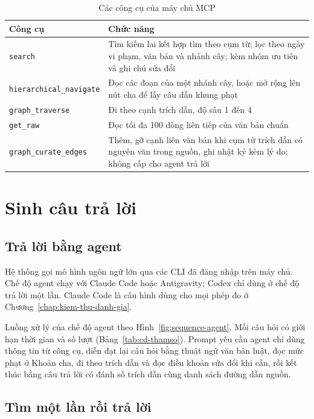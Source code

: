 \begin{table}[H]
\centering
\caption{Các công cụ của máy chủ MCP}
\label{tab:mcp-tools}
\footnotesize
\begin{tabularx}{\textwidth}{@{}l >{\raggedright\arraybackslash}X@{}}
\toprule
\textbf{Công cụ} & \textbf{Chức năng} \\
\midrule
\texttt{search} & Tìm kiếm lai kết hợp tìm theo cụm từ; lọc theo ngày vi phạm, văn bản và nhánh cây; kèm nhóm ưu tiên và ghi chú sửa đổi \\
\texttt{hierarchical\_navigate} & Đọc các đoạn của một nhánh cây, hoặc mở rộng lên nút cha để lấy câu dẫn khung phạt \\
\texttt{graph\_traverse} & Đi theo cạnh trích dẫn, độ sâu 1 đến 4 \\
\texttt{get\_raw} & Đọc tối đa 100 dòng liên tiếp của văn bản chuẩn \\
\texttt{graph\_curate\_edges} & Thêm, gỡ cạnh liên văn bản khi cụm từ trích dẫn có nguyên văn trong nguồn, ghi nhật ký kèm lý do; không cấp cho agent trả lời \\
\bottomrule
\end{tabularx}
\end{table}


\section{Sinh câu trả lời}
\label{sec:cd-agent}

\subsection{Trả lời bằng agent}

Hệ thống gọi mô hình ngôn ngữ lớn qua các CLI đã đăng nhập trên máy chủ. Chế độ agent chạy với Claude Code hoặc Antigravity; Codex chỉ dùng ở chế độ trả lời một lần. Claude Code là cấu hình dùng cho mọi phép đo ở Chương~\ref{chap:kiem-thu-danh-gia}.

Luồng xử lý của chế độ agent theo Hình~\ref{fig:sequence-agent}. Mỗi câu hỏi có giới hạn thời gian và số lượt (Bảng~\ref{tab:cd-thamso}). Prompt yêu cầu agent chỉ dùng thông tin từ công cụ, diễn đạt lại câu hỏi bằng thuật ngữ văn bản luật, đọc mức phạt ở Khoản cha, đi theo trích dẫn và đọc điều khoản sửa đổi khi cần, rồi kết thúc bằng câu trả lời có đánh số trích dẫn cùng danh sách đường dẫn nguồn.

\subsection{Tìm một lần rồi trả lời}

